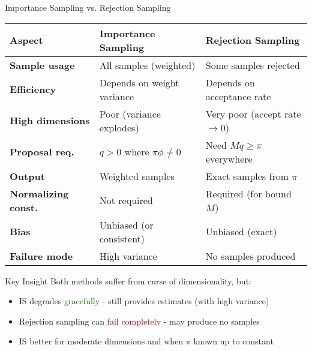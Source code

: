 \documentclass[aspectratio=169]{beamer}
\begin{document}
\begin{frame}{Importance Sampling vs. Rejection Sampling}
\begin{center}
\small
\begin{tabular}{lll}
\toprule
\textbf{Aspect} & \textbf{Importance Sampling} & \textbf{Rejection Sampling} \\
\midrule
\textbf{Sample usage} & All samples (weighted) & Some samples rejected \\
\textbf{Efficiency} & Depends on weight variance & Depends on acceptance rate \\
\textbf{High dimensions} & Poor (variance explodes) & Very poor (accept rate $\to 0$) \\
\textbf{Proposal req.} & $q > 0$ where $\pi\phi \neq 0$ & Need $Mq \geq \pi$ everywhere \\
\textbf{Output} & Weighted samples & Exact samples from $\pi$ \\
\textbf{Normalizing const.} & Not required & Required (for bound $M$) \\
\textbf{Bias} & Unbiased (or consistent) & Unbiased (exact) \\
\textbf{Failure mode} & High variance & No samples produced \\
\bottomrule
\end{tabular}
\end{center}

\vspace{0.5cm}
\begin{block}{Key Insight}
Both methods suffer from curse of dimensionality, but:
\begin{itemize}
\item IS degrades \textcolor{darkgreen}{gracefully} - still provides estimates (with high variance)
\item Rejection sampling can \textcolor{darkred}{fail completely} - may produce no samples
\item IS better for moderate dimensions and when $\pi$ known up to constant
\end{itemize}
\end{block}
\end{frame}
\end{document}
